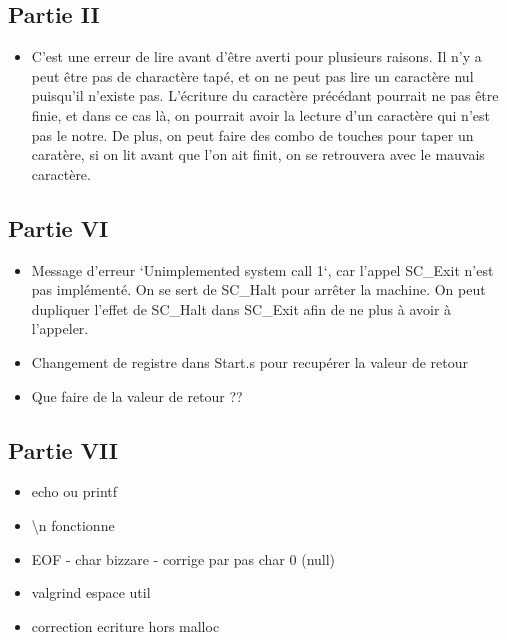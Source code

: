 \documentclass{article}
\begin{document}
\subsection{Partie II}
\begin{itemize}
    \item C'est une erreur de lire avant d'être averti pour plusieurs raisons. Il n'y a peut être pas de charactère tapé, et on ne peut pas lire un caractère nul puisqu'il n'existe pas.
    L'écriture du caractère précédant pourrait ne pas être finie, et dans ce cas là, on pourrait avoir la lecture d'un caractère qui n'est pas le notre.
    De plus, on peut faire des combo de touches pour taper un caratère, si on lit avant que l'on ait finit, on se retrouvera avec le mauvais caractère.

    
\end{itemize}


\subsection{Partie VI}
\begin{itemize}
    \item Message d'erreur `Unimplemented system call 1`, car l'appel SC\_Exit n'est pas implémenté. On se sert de SC\_Halt pour arrêter la machine.
    On peut dupliquer l'effet de SC\_Halt dans SC\_Exit afin de ne plus à avoir à l'appeler.
    \item Changement de registre dans Start.s pour recupérer la valeur de retour
    \item Que faire de la valeur de retour ??
\end{itemize}

\subsection{Partie VII}
\begin{itemize}
    \item echo ou printf
    \item \textbackslash n fonctionne
    \item EOF - char bizzare - corrige par pas char 0 (null)
    \item valgrind espace util 
    \item correction ecriture hors malloc
\end{itemize}
\end{document}
